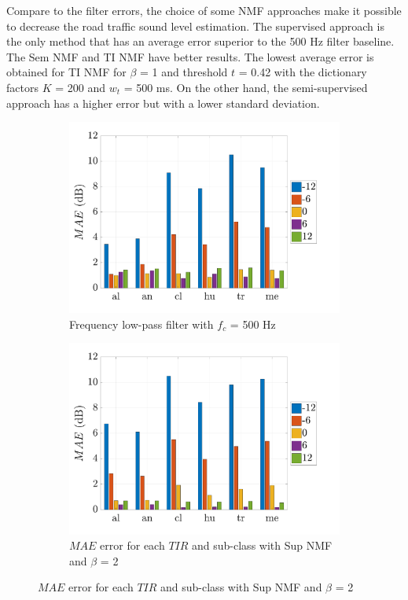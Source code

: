 \documentclass[twocolumn,a4paper,10pt]{article}
\begin{document}
Compare to the filter errors, the choice of some NMF approaches make it possible to decrease the road traffic sound level estimation. The supervised approach is the only method that has an average error superior to the 500 Hz filter baseline. The Sem NMF and TI NMF have better results. The lowest average error is obtained for TI NMF for $\beta$ = 1 and threshold $t$ = 0.42 with the dictionary factors $K$ = 200 and $w_t$ = 500 ms. On the other hand, the semi-supervised approach has a higher error but with a lower standard deviation.

\begin{figure}[t]
    \centering
    \begin{subfigure}[t]{0.45\textwidth}
        \centering
        \includegraphics[width=\linewidth]{figures/filter_bar.pdf}
        \caption{Frequency low-pass filter with $f_c$ = 500 Hz}
        \label{fig:TIR_class_filter}
    \end{subfigure}%
    \hfill
    \begin{subfigure}[t]{0.45\textwidth}
        \centering
        \includegraphics[width=\linewidth]{figures/sup_bar.pdf}
        \caption{$MAE$ error for each $TIR$ and sub-class with Sup NMF and $\beta$ = 2}
                \label{fig:TIR_class_sup}
    \end{subfigure}


\end{figure}
\end{document}
